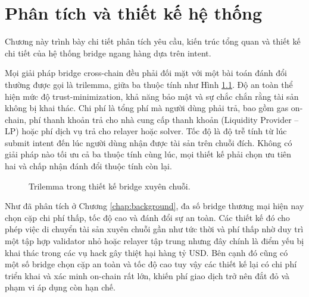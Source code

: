 \chapter{Phân tích và thiết kế hệ thống}
\label{chap:design}

Chương này trình bày chi tiết phân tích yêu cầu, 
kiến trúc tổng quan 
và thiết kế chi tiết của hệ thống bridge ngang hàng dựa trên intent.

Mọi giải pháp bridge cross-chain đều phải đối mặt với một bài toán
đánh đổi thường được gọi là trilemma,
giữa ba thuộc tính như Hình \ref{fig:trilemma}.
Độ an toàn thể hiện mức độ trust-minimization, 
khả năng bảo mật và sự chắc chắn rằng tài sản không bị khai thác. 
Chi phí là tổng phí mà người dùng phải trả,
bao gồm gas on-chain, phí thanh khoản trả cho nhà cung cấp thanh khoản
(Liquidity Provider -- LP)
hoặc phí dịch vụ trả cho relayer hoặc solver.
Tốc độ là độ trễ tính từ lúc submit intent đến lúc người dùng nhận được tài sản trên chuỗi đích. 
Không có giải pháp nào tối ưu cả ba thuộc tính cùng lúc,
mọi thiết kế phải chọn ưu tiên hai và chấp nhận đánh đổi thuộc tính còn lại.

\begin{figure}[H]
  \centering
  \caption{Trilemma trong thiết kế bridge xuyên chuỗi.}
  \label{fig:trilemma}
\end{figure}

Như đã phân tích ở Chương \ref{chap:background},
đa số bridge thương mại hiện nay chọn cặp
chi phí thấp, tốc độ cao và đánh đổi sự an toàn.
Các thiết kế đó cho phép việc di chuyển tài sản xuyên chuỗi
gần như tức thời và phí thấp nhờ duy trì
một tập hợp validator nhỏ hoặc relayer tập trung
nhưng đây chính là điểm yếu bị khai thác trong các vụ hack gây thiệt hại hàng tỷ USD.
Bên cạnh đó cũng có một số bridge chọn cặp
an toàn và tốc độ cao tuy vậy các thiết kế lại có chi phí triển khai và xác minh on-chain rất lớn, khiến phí giao
dịch trở nên đắt đỏ và phạm vi áp dụng còn hạn chế.


